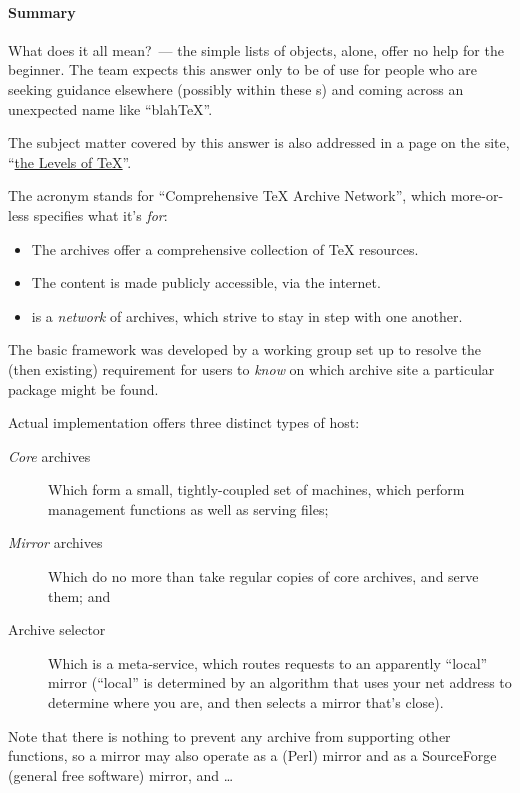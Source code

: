 \paragraph{Summary}
What does it all mean?~--- the simple lists of objects, alone, offer
no help for the beginner.  The  team expects this answer
only to be of use for people who are seeking guidance elsewhere
(possibly within these s) and coming across an unexpected
name like ``blah\TeX{}''.

The subject matter covered by this answer is also addressed in a page
on the  site, %
``\href{http://tug.org/levels.html}{the Levels of \TeX{}}''.


The acronym stands for ``Comprehensive \TeX{} Archive Network'', which
more-or-less specifies what it's \emph{for}:
\begin{itemize}
\item The archives offer a comprehensive collection of \TeX{} resources.
\item The content is made publicly accessible, via the internet.
\item {} is a \emph{network} of archives, which strive to
  stay in step with one another.
\end{itemize}
The basic framework was developed by a  working group set up
to resolve the (then existing) requirement for users to \emph{know} on
which archive site a particular package might be found.

Actual implementation offers three distinct types of host:
\begin{description}
\item[\emph{Core} archives]Which form a small, tightly-coupled set of
  machines, which perform management functions as well as serving
  files;
\item[\emph{Mirror} archives]Which do no more than take regular copies
  of core archives, and serve them; and
\item[Archive selector]Which is a meta-service, which routes requests
  to an apparently ``local'' mirror (``local'' is determined by an
  algorithm that uses your net address to determine where you are, and
  then selects a mirror that's close).
\end{description}
Note that there is nothing to prevent any archive from supporting
other functions, so a  mirror may also operate as a
 (Perl) mirror and as a SourceForge (general free software)
mirror, and \dots{}

